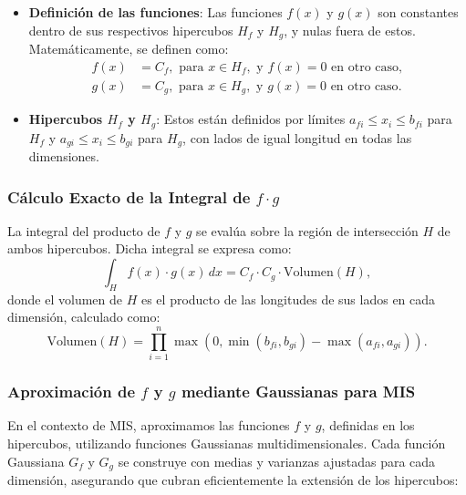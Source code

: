 \documentclass{article}
\begin{document}
\begin{itemize}
    \item \textbf{Definición de las funciones}: Las funciones \( f(x) \) y \( g(x) \) son constantes dentro de sus respectivos hipercubos \( H_f \) y \( H_g \), y nulas fuera de estos. Matemáticamente, se definen como:
    \begin{align*}
        f(x) &= C_f, \text{ para } x \in H_f, \text{ y } f(x) = 0 \text{ en otro caso}, \\
        g(x) &= C_g, \text{ para } x \in H_g, \text{ y } g(x) = 0 \text{ en otro caso}.
    \end{align*}
    \item \textbf{Hipercubos \( H_f \) y \( H_g \)}: Estos están definidos por límites \( a_{fi} \leq x_i \leq b_{fi} \) para \( H_f \) y \( a_{gi} \leq x_i \leq b_{gi} \) para \( H_g \), con lados de igual longitud en todas las dimensiones.
\end{itemize}

\subsubsection{Cálculo Exacto de la Integral de \( f \cdot g \)}
La integral del producto de \( f \) y \( g \) se evalúa sobre la región de intersección \( H \) de ambos hipercubos. Dicha integral se expresa como:
\begin{equation*}
    \int_{H} f(x) \cdot g(x) \, dx = C_f \cdot C_g \cdot \text{Volumen}(H),
\end{equation*}
donde el volumen de \( H \) es el producto de las longitudes de sus lados en cada dimensión, calculado como:
\begin{equation*}
    \text{Volumen}(H) = \prod_{i=1}^{n} \max(0, \min(b_{fi}, b_{gi}) - \max(a_{fi}, a_{gi})).
\end{equation*}

\subsubsection{Aproximación de \( f \) y \( g \) mediante Gaussianas para MIS}
En el contexto de MIS, aproximamos las funciones \( f \) y \( g \), definidas en los hipercubos, utilizando funciones Gaussianas multidimensionales. Cada función Gaussiana \( G_f \) y \( G_g \) se construye con medias y varianzas ajustadas para cada dimensión, asegurando que cubran eficientemente la extensión de los hipercubos:
\end{document}
